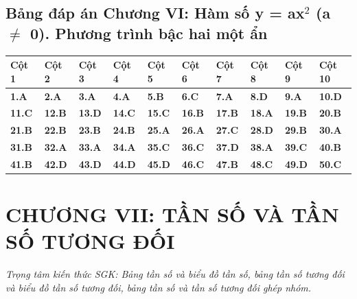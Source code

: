 \documentclass[11pt,a4paper]{article}
\begin{document}
\subsection*{\color{primary} Bảng đáp án Chương VI: Hàm số y = ax$^2$ (a $\ne$ 0). Phương trình bậc hai một ẩn}
\begin{center}
\renewcommand{\arraystretch}{1.25}
\begin{tabularx}{\textwidth}{*{10}{>{\centering\arraybackslash}X}}
\toprule
\textbf{\color{primary} Cột 1} & \textbf{\color{primary} Cột 2} & \textbf{\color{primary} Cột 3} & \textbf{\color{primary} Cột 4} & \textbf{\color{primary} Cột 5} & \textbf{\color{primary} Cột 6} & \textbf{\color{primary} Cột 7} & \textbf{\color{primary} Cột 8} & \textbf{\color{primary} Cột 9} & \textbf{\color{primary} Cột 10} \\
\midrule
\textbf{1.A} & \textbf{2.A} & \textbf{3.A} & \textbf{4.A} & \textbf{5.B} & \textbf{6.C} & \textbf{7.A} & \textbf{8.D} & \textbf{9.A} & \textbf{10.D} \\
\rowcolor{rowtint} \textbf{11.C} & \textbf{12.B} & \textbf{13.D} & \textbf{14.C} & \textbf{15.C} & \textbf{16.B} & \textbf{17.B} & \textbf{18.A} & \textbf{19.B} & \textbf{20.B} \\
\textbf{21.B} & \textbf{22.B} & \textbf{23.B} & \textbf{24.B} & \textbf{25.A} & \textbf{26.A} & \textbf{27.C} & \textbf{28.D} & \textbf{29.B} & \textbf{30.A} \\
\rowcolor{rowtint} \textbf{31.B} & \textbf{32.A} & \textbf{33.A} & \textbf{34.A} & \textbf{35.C} & \textbf{36.C} & \textbf{37.D} & \textbf{38.A} & \textbf{39.C} & \textbf{40.B} \\
\textbf{41.B} & \textbf{42.D} & \textbf{43.D} & \textbf{44.D} & \textbf{45.D} & \textbf{46.C} & \textbf{47.B} & \textbf{48.C} & \textbf{49.D} & \textbf{50.C} \\
\bottomrule
\end{tabularx}
\end{center}\vspace{10pt}
\section*{\color{primary} CHƯƠNG VII: TẦN SỐ VÀ TẦN SỐ TƯƠNG ĐỐI}
\textit{Trọng tâm kiến thức SGK: Bảng tần số và biểu đồ tần số, bảng tần số tương đối và biểu đồ tần số tương đối, bảng tần số và tần số tương đối ghép nhóm.}\par\vspace{4pt}
\end{document}
